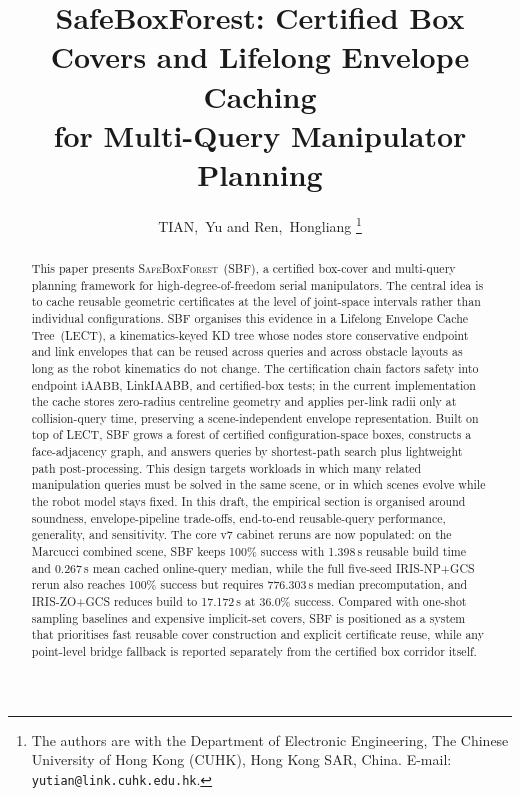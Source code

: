 \documentclass[journal]{IEEEtran}
\newcommand{\iAABB}{\ensuremath{\mathrm{iAABB}}}
\begin{document}
\title{SafeBoxForest: Certified Box Covers and Lifelong Envelope Caching\\
for Multi-Query Manipulator Planning}

\author{TIAN,~Yu and Ren,~Hongliang%
\thanks{The authors are with the Department of Electronic Engineering,
The Chinese University of Hong Kong (CUHK), Hong Kong SAR, China.
E-mail: \texttt{yutian@link.cuhk.edu.hk}.}}

\maketitle

\begin{abstract}
This paper presents \textsc{SafeBoxForest}~(SBF), a certified box-cover and
multi-query planning framework for high-degree-of-freedom serial manipulators.
The central idea is to cache reusable geometric certificates at the level of
joint-space intervals rather than individual configurations. SBF organises this
evidence in a Lifelong Envelope Cache Tree~(LECT), a kinematics-keyed KD tree
whose nodes store conservative endpoint and link envelopes that can be reused
across queries and across obstacle layouts as long as the robot kinematics do
not change. The certification chain factors safety into endpoint \iAABB,
LinkIAABB, and certified-box tests; in the current implementation the cache stores
zero-radius centreline geometry and applies per-link radii only at
collision-query time, preserving a scene-independent envelope representation.
Built on top of LECT, SBF grows a forest of certified configuration-space
boxes, constructs a face-adjacency graph, and answers queries by shortest-path
search plus lightweight path post-processing. This design targets workloads in
which many related manipulation queries must be solved in the same scene, or in
which scenes evolve while the robot model stays fixed. In this draft, the
empirical section is organised around soundness, envelope-pipeline trade-offs,
end-to-end reusable-query performance, generality, and sensitivity. The core
v7 cabinet reruns are now populated: on the Marcucci combined scene, SBF keeps
100\% success with 1.398\,s reusable build time and 0.267\,s mean cached
online-query median, while the full five-seed IRIS-NP+GCS rerun also reaches
100\% success but requires 776.303\,s median precomputation, and IRIS-ZO+GCS
reduces build to 17.172\,s at 36.0\% success. Compared with one-shot sampling
baselines and expensive implicit-set covers, SBF is positioned as a system
that prioritises fast reusable cover construction and explicit certificate
reuse, while any point-level bridge fallback is reported separately from the
certified box corridor itself.
\end{abstract}
\end{document}
